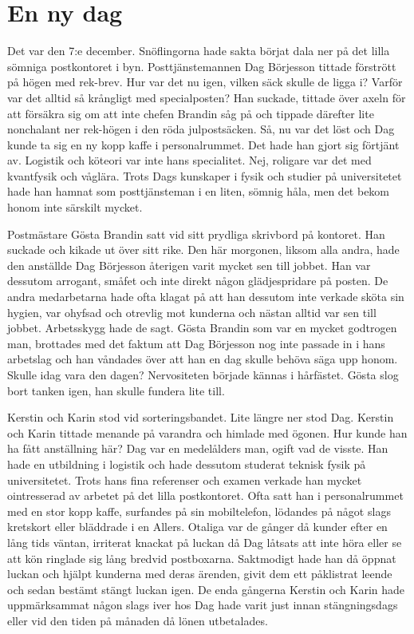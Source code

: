 \chapter[ennydag]{En ny dag}

Det var den 7:e december. Snöflingorna hade sakta börjat dala ner på det lilla sömniga postkontoret i byn. Posttjänstemannen Dag Börjesson tittade förstrött på högen med rek-brev. Hur var det nu igen, vilken säck skulle de ligga i? Varför var det alltid så krångligt med specialposten? Han suckade, tittade över axeln för att försäkra sig om att inte chefen Brandin såg på och tippade därefter lite nonchalant ner rek-högen i den röda julpostsäcken. Så, nu var det löst och Dag kunde ta sig en ny kopp kaffe i personalrummet. Det hade han gjort sig förtjänt av. Logistik och köteori var inte hans specialitet. Nej, roligare var det med kvantfysik och våglära. Trots Dags kunskaper i fysik och studier på universitetet hade han hamnat som posttjänsteman i en liten, sömnig håla, men det bekom honom inte särskilt mycket. 

Postmästare Gösta Brandin satt vid sitt prydliga skrivbord på kontoret. Han suckade och kikade ut över sitt rike. Den här morgonen, liksom alla andra, hade den anställde Dag Börjesson återigen varit mycket sen till jobbet. Han var dessutom arrogant, småfet och inte direkt någon glädjespridare på posten. De andra medarbetarna hade ofta klagat på att han dessutom inte verkade sköta sin hygien, var ohyfsad och otrevlig mot kunderna och nästan alltid var sen till jobbet. Arbetsskygg hade de sagt. Gösta Brandin som var en mycket godtrogen man, brottades med det faktum att Dag Börjesson nog inte passade in i hans arbetslag och han våndades över att han en dag skulle behöva säga upp honom. Skulle idag vara den dagen? Nervositeten började kännas i hårfästet. Gösta slog bort tanken igen, han skulle fundera lite till. 

Kerstin och Karin stod vid sorteringsbandet. Lite längre ner stod Dag. Kerstin och Karin tittade menande på varandra och himlade med ögonen. Hur kunde han ha fått anställning här? Dag var en medelålders man, ogift vad de visste. Han hade en utbildning i logistik och hade dessutom studerat teknisk fysik på universitetet. Trots hans fina referenser och examen verkade han mycket ointresserad av arbetet på det lilla postkontoret. Ofta satt han i personalrummet med en stor kopp kaffe, surfandes på sin mobiltelefon, lödandes på något slags kretskort eller bläddrade i en Allers. Otaliga var de gånger då kunder efter en lång tids väntan, irriterat knackat på luckan då Dag låtsats att inte höra eller se att kön ringlade sig lång bredvid postboxarna. Saktmodigt hade han då öppnat luckan och hjälpt kunderna med deras ärenden, givit dem ett påklistrat leende och sedan bestämt stängt luckan igen. De enda gångerna Kerstin och Karin hade uppmärksammat någon slags iver hos Dag hade varit just innan stängningsdags eller vid den tiden på månaden då lönen utbetalades.

